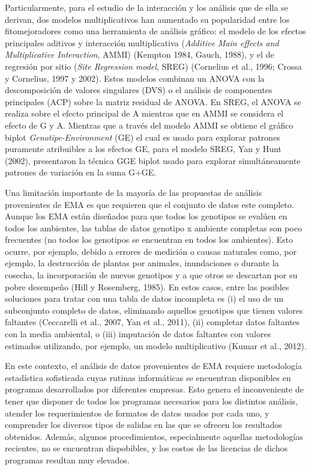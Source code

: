 Particularmente, para el estudio de la interacción y los análisis que de ella se derivan, dos modelos multiplicativos han aumentado su popularidad entre los fitomejoradores como una herramienta de análisis gráfico: el modelo de los efectos principales aditivos y interacción multiplicativa (\emph{Additive Main effects and Multiplicative Interaction}, AMMI) (Kempton 1984, Gauch, 1988), y el de regresión por sitio (\emph{Site Regression model}, SREG) (Cornelius et al., 1996; Crossa y Cornelius, 1997 y 2002).  Estos modelos combinan un ANOVA con la descomposición de valores singulares (DVS) o el análisis de componentes principales (ACP) sobre la matriz residual de ANOVA. En SREG, el ANOVA se realiza sobre el efecto principal de A mientras que en AMMI se considera el efecto de G y A. Mientras que a través del modelo AMMI se obtiene el gráfico biplot \emph{Genotipe-Environment} (GE) el cual es usado para explorar patrones puramente atribuibles a los efectos GE, para el modelo SREG, Yan y Hunt (2002), presentaron la técnica GGE biplot usado para explorar simultáneamente patrones de variación en la suma G+GE.

Una limitación importante de la mayoría de las propuestas de análisis provenientes de EMA es que requieren que el conjunto de datos este completo. Aunque los EMA están diseñados para que todos los genotipos se evalúen en todos los ambientes,  las tablas de datos genotipo x ambiente completas son poco frecuentes (no todos los genotipos se encuentran en todos los ambientes). Esto ocurre, por ejemplo, debido a errores de medición o causas naturales como, por ejemplo, la destrucción de plantas por animales, inundaciones o durante la cosecha, la incorporación de nuevos genotipos y a que otros se descartan por su pobre desempeño (Hill y Rosemberg, 1985). En estos casos, entre las posibles soluciones para tratar con una tabla de datos incompleta es (i) el uso de un subconjunto completo de datos, eliminando aquellos genotipos que tienen valores faltantes (Ceccarelli et al., 2007, Yan et al., 2011), (ii) completar datos faltantes con la media ambiental, o (iii) imputación de datos faltantes con valores estimados utilizando, por ejemplo, un modelo multiplicativo (Kumar et al., 2012). 

En este contexto, el análisis de datos provenientes de EMA requiere metodología estadística sofisticada cuyas rutinas informáticas se encuentran disponibles en programas desarrollados por diferentes empresas. Esto genera el inconveniente de tener que disponer de todos los programas necesarios para los distintos análisis, atender los requerimientos de formatos de datos usados por cada uno, y comprender los diversos tipos de salidas en las que se ofrecen los resultados obtenidos. Además, algunos procedimientos, especialmente aquellas metodologías recientes, no se encuentran dispobibles, y los costos de las licencias de dichos programas resultan muy elevados. 


